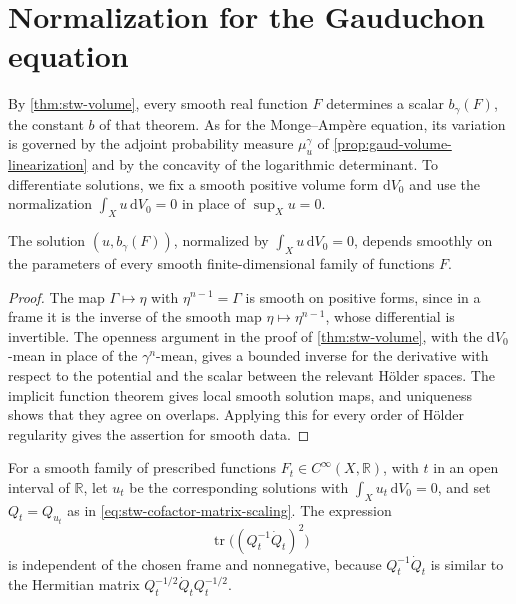 \section{Normalization for the Gauduchon equation}

By \cref{thm:stw-volume}, every smooth real function $F$ determines a scalar $b_\gamma(F)$, the constant $b$ of that theorem. As for the Monge--Amp\`ere equation, its variation is governed by the adjoint probability measure $\mu_u^\gamma$ of \cref{prop:gaud-volume-linearization} and by the concavity of the logarithmic determinant. To differentiate solutions, we fix a smooth positive volume form $\mathrm{d}V_0$ and use the normalization $\int_Xu\,\mathrm{d}V_0=0$ in place of $\sup_Xu=0$.

\begin{lemma}\label{lem:gaud-volume-smooth-dependence}
The solution $(u,b_\gamma(F))$, normalized by $\int_Xu\,\mathrm{d}V_0=0$, depends smoothly on the parameters of every smooth finite-dimensional family of functions $F$.
\end{lemma}
\begin{proof}
The map $\Gamma\mapsto\eta$ with $\eta^{n-1}=\Gamma$ is smooth on positive forms, since in a frame it is the inverse of the smooth map $\eta\mapsto\eta^{n-1}$, whose differential is invertible. The openness argument in the proof of \cref{thm:stw-volume}, with the $\mathrm{d}V_0$-mean in place of the $\gamma^n$-mean, gives a bounded inverse for the derivative with respect to the potential and the scalar between the relevant H\"older spaces. The implicit function theorem gives local smooth solution maps, and uniqueness shows that they agree on overlaps. Applying this for every order of H\"older regularity gives the assertion for smooth data.
\end{proof}

For a smooth family of prescribed functions $F_t\in C^\infty(X,\mathbb R)$, with $t$ in an open interval of $\mathbb R$, let $u_t$ be the corresponding solutions with $\int_Xu_t\,\mathrm{d}V_0=0$, and set $Q_t=Q_{u_t}$ as in \eqref{eq:stw-cofactor-matrix-scaling}. The expression
\[
 \operatorname{tr}\bigl((Q_t^{-1}\dot Q_t)^2\bigr)
\]
is independent of the chosen frame and nonnegative, because $Q_t^{-1}\dot Q_t$ is similar to the Hermitian matrix $Q_t^{-1/2}\dot Q_t Q_t^{-1/2}$.

